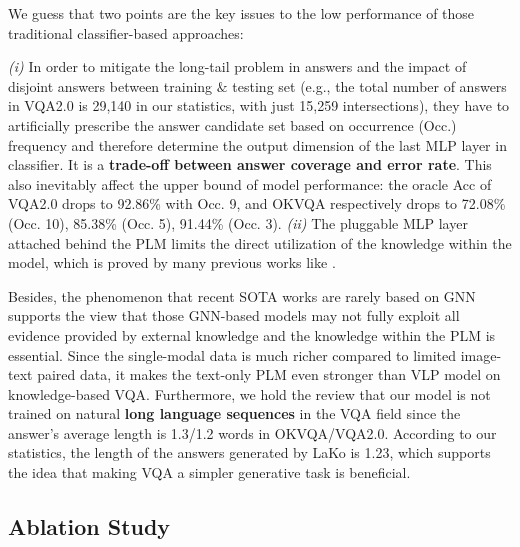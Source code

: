 \documentclass[sigconf]{acmart}
\begin{document}
We guess that two points are the key issues to the low performance of those traditional classifier-based approaches:

\emph{(i)} In order to mitigate the long-tail problem in answers and the impact of disjoint answers between training $\&$ testing set (e.g., the total number of answers in VQA2.0 is 29,140 in our statistics, with just 15,259 intersections),
they have to artificially prescribe the answer candidate set based on occurrence (Occ.) frequency and therefore determine the output dimension of the last MLP layer in classifier. It is a \textbf{trade-off between answer coverage and error rate}. 
This also inevitably affect the upper bound of model performance: the oracle Acc of VQA2.0 drops to 92.86\% with Occ. 9, and OKVQA respectively drops to 72.08\% (Occ. 10), 85.38\% (Occ. 5), 91.44\% (Occ. 3).
\emph{(ii)} The pluggable MLP layer attached behind the PLM limits the direct utilization of the knowledge within the model, which is proved by many previous works like \citep{DBLP:conf/acl/GaoFC20}. 


Besides, the phenomenon that recent SOTA works are rarely based on GNN supports the view that those GNN-based models may not fully exploit all evidence provided by external knowledge \citep{DBLP:conf/aaai/BianH0021} and the knowledge within the PLM is essential. Since the single-modal data is much richer compared to limited image-text paired data, it makes the text-only PLM even stronger than VLP model on knowledge-based VQA.
Furthermore, we hold the review that our model is not trained on natural \textbf{long language sequences} in the VQA field since the answer's average length is 1.3/1.2 words in OKVQA/VQA2.0. According to our statistics, the length of the answers generated by LaKo is 1.23, which supports the idea that making VQA a simpler generative task is beneficial. 





\subsection{Ablation Study} \label{sec:ablation}
\end{document}

